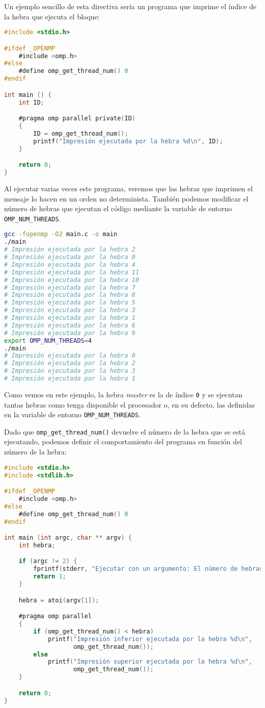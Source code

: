 Un ejemplo sencillo de esta directiva sería un programa que imprime el índice de la hebra que ejecuta el bloque:

\begin{lstlisting}[language=C]
#include <stdio.h>

#ifdef _OPENMP
	#include <omp.h>
#else
	#define omp_get_thread_num() 0
#endif

int main () {
	int ID;

	#pragma omp parallel private(ID)
	{
		ID = omp_get_thread_num();
		printf("Impresión ejecutada por la hebra %d\n", ID);
	}

	return 0;
}
\end{lstlisting}

Al ejecutar varias veces este programa, veremos que las hebras que imprimen el mensaje lo hacen en un orden no determinista.
También podemos modificar el número de hebras que ejecutan el código mediante la variable de entorno \texttt{OMP\_NUM\_THREADS}.

\begin{lstlisting}[language=sh]
gcc -fopenmp -O2 main.c -o main
./main
# Impresión ejecutada por la hebra 2
# Impresión ejecutada por la hebra 0
# Impresión ejecutada por la hebra 4
# Impresión ejecutada por la hebra 11
# Impresión ejecutada por la hebra 10
# Impresión ejecutada por la hebra 7
# Impresión ejecutada por la hebra 8
# Impresión ejecutada por la hebra 5
# Impresión ejecutada por la hebra 3
# Impresión ejecutada por la hebra 1
# Impresión ejecutada por la hebra 6
# Impresión ejecutada por la hebra 9
export OMP_NUM_THREADS=4
./main
# Impresión ejecutada por la hebra 0
# Impresión ejecutada por la hebra 2
# Impresión ejecutada por la hebra 3
# Impresión ejecutada por la hebra 1
\end{lstlisting}

Como vemos en este ejemplo, la hebra \textit{master} es la de índice \texttt{0} y se ejecutan tantas hebras como tenga disponible el procesador o, en su defecto, las definidas en la variable de entorno \texttt{OMP\_NUM\_THREADS}.

Dado que \texttt{omp\_get\_thread\_num()} devuelve el número de la hebra que se está ejecutando, podemos definir el comportamiento del programa en función del número de la hebra:

\begin{lstlisting}[language=C]
#include <stdio.h>
#include <stdlib.h>

#ifdef _OPENMP
	#include <omp.h>
#else
	#define omp_get_thread_num() 0
#endif

int main (int argc, char ** argv) {
	int hebra;

	if (argc != 2) {
		fprintf(stderr, "Ejecutar con un argumento: El número de hebras.\n");
		return 1;
	}

	hebra = atoi(argv[1]);

	#pragma omp parallel
	{
		if (omp_get_thread_num() < hebra)
			printf("Impresión inferior ejecutada por la hebra %d\n",
			       omp_get_thread_num());
		else
			printf("Impresión superior ejecutada por la hebra %d\n",
			       omp_get_thread_num());
	}

	return 0;
}
\end{lstlisting}

